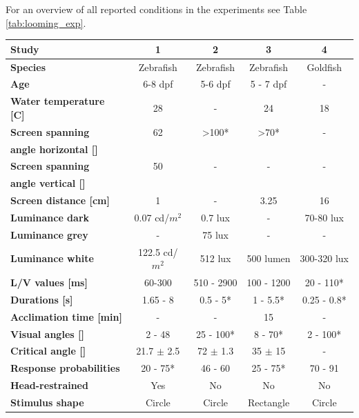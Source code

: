 \documentclass[a4paper,10pt,hidelinks]{scrreprt}
\begin{document}
	For an overview of all reported conditions in the experiments see Table \ref{tab:looming_exp}.\\
	\begin{table} [!th]
		\begin{center}
			\begin{tabular}{l|c|c|c|c}
				\textbf{Study} & \textbf{1} & \textbf{2} & \textbf{3} & \textbf{4}\\
				\hline
				\textbf{Species} & Zebrafish & Zebrafish & Zebrafish & Goldfish\\
				\textbf{Age} & 6-8 dpf & 5-6 dpf & 5 - 7 dpf & -\\
				\textbf{Water temperature [\textdegree C]} & 28  & - & 24  & 18 \\
				\textbf{Screen spanning} & 62 & >100* & >70* & -\\
				\textbf{angle horizontal [\textdegree]} & & & & \\
				\textbf{Screen spanning} & 50 & - & - & -\\
				\textbf{angle vertical [\textdegree]} & & & & \\
				\textbf{Screen distance [cm]} & 1 & - & 3.25 & 16\\
				\textbf{Luminance dark} & 0.07 cd/$m^2$ & 0.7 lux & - & 70-80 lux\\
				\textbf{Luminance grey} & - & 75 lux & - & -\\
				\textbf{Luminance white} & 122.5 cd/$m^2$ & 512 lux & 500 lumen & 300-320 lux\\
				\textbf{L/V values [ms]} & 60-300 \dag & 510 - 2900 \dag & 100 - 
				1200 & 20 - 110*\\
				\textbf{Durations [s]} & 1.65 - 8 & 0.5 - 5* & 1 - 5.5* & 0.25 - 0.8*\\
				\textbf{Acclimation time [min]} & - & - & 15 & -\\
				\textbf{Visual angles [\textdegree]} & 2 - 48 & 25 - 100* & 8 - 70* & 2 - 100*\\
				\textbf{Critical angle [\textdegree]} & 21.7 $\pm$ 2.5 & 72 $\pm$ 1.3 & 35 $\pm$ 15 
				& -\\
				\textbf{Response probabilities} & 20 - 75* & 46 - 60 & 25 - 75* & 70 - 91\\
				\textbf{Head-restrained} & Yes & No & No & No\\
				\textbf{Stimulus shape} & Circle & Circle & Rectangle & Circle\\

\end{tabular}
\end{center}
\end{table}
\end{document}
